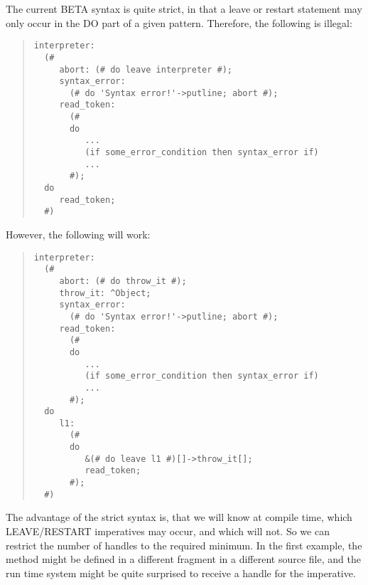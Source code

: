 The current BETA syntax is quite strict, in that a leave or
restart statement may only occur in the DO part of a given
pattern.  Therefore, the following is illegal:
\begin{quote}\begin{verbatim}interpreter:
  (#
     abort: (# do leave interpreter #);
     syntax_error:
       (# do 'Syntax error!'->putline; abort #);
     read_token:
       (#
       do
          ...
          (if some_error_condition then syntax_error if)
          ...
       #);
  do
     read_token;
  #)
\end{verbatim}\end{quote}
However, the following will work:
\begin{quote}\begin{verbatim}interpreter:
  (#
     abort: (# do throw_it #);
     throw_it: ^Object;
     syntax_error:
       (# do 'Syntax error!'->putline; abort #);
     read_token:
       (#
       do
          ...
          (if some_error_condition then syntax_error if)
          ...
       #);
  do
     l1:
       (#
       do
          &(# do leave l1 #)[]->throw_it[];
          read_token;
       #);
  #)
\end{verbatim}\end{quote}
The advantage of the strict syntax is, that we will know at
compile time, which LEAVE/RESTART imperatives may occur, and
which will not.  So we can restrict the number of handles to the
required minimum.  In the first example, the  method
might be defined in a different fragment in a different source
file, and the run time system might be quite surprised to receive
a handle for the  imperative.

